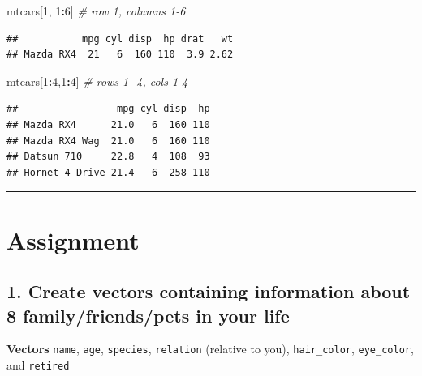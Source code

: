 \documentclass[
]{article}
\newenvironment{Shaded}{\begin{snugshade}}{\end{snugshade}}
\newcommand{\CommentTok}[1]{\textcolor[rgb]{0.56,0.35,0.01}{\textit{#1}}}
\newcommand{\DecValTok}[1]{\textcolor[rgb]{0.00,0.00,0.81}{#1}}
\newcommand{\NormalTok}[1]{#1}
\newcommand{\OperatorTok}[1]{\textcolor[rgb]{0.81,0.36,0.00}{\textbf{#1}}}
\begin{document}
\begin{Shaded}
\begin{Highlighting}[]
\NormalTok{mtcars[}\DecValTok{1}\NormalTok{, }\DecValTok{1}\OperatorTok{:}\DecValTok{6}\NormalTok{] }\CommentTok{# row 1, columns 1-6}
\end{Highlighting}
\end{Shaded}

\begin{verbatim}
##           mpg cyl disp  hp drat   wt
## Mazda RX4  21   6  160 110  3.9 2.62
\end{verbatim}

\begin{Shaded}
\begin{Highlighting}[]
\NormalTok{mtcars[}\DecValTok{1}\OperatorTok{:}\DecValTok{4}\NormalTok{,}\DecValTok{1}\OperatorTok{:}\DecValTok{4}\NormalTok{] }\CommentTok{# rows 1 -4, cols 1-4}
\end{Highlighting}
\end{Shaded}

\begin{verbatim}
##                 mpg cyl disp  hp
## Mazda RX4      21.0   6  160 110
## Mazda RX4 Wag  21.0   6  160 110
## Datsun 710     22.8   4  108  93
## Hornet 4 Drive 21.4   6  258 110
\end{verbatim}

\begin{center}\rule{0.5\linewidth}{0.5pt}\end{center}

\hypertarget{assignment}{%
\section{\texorpdfstring{\textbf{Assignment}}{Assignment}}\label{assignment}}

\hypertarget{create-vectors-containing-information-about-8-familyfriendspets-in-your-life}{%
\subsection{\texorpdfstring{\textbf{1. Create vectors containing
information about 8 family/friends/pets in your
life}}{1. Create vectors containing information about 8 family/friends/pets in your life}}\label{create-vectors-containing-information-about-8-familyfriendspets-in-your-life}}

\textbf{Vectors } \texttt{name}, \texttt{age}, \texttt{species},
\texttt{relation} (relative to you), \texttt{hair\_color},
\texttt{eye\_color}, and \texttt{retired}
\end{document}

